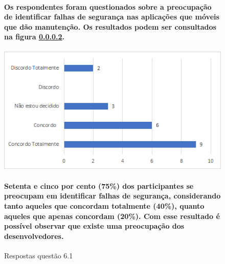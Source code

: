 \begin{figure}[!t]
\centering
\paragraph{Os respondentes foram questionados sobre a preocupação de identificar falhas de segurança nas aplicações que móveis que dão manutenção. Os resultados podem ser consultados na figura \ref{fig:6.1}.}
\includegraphics[scale=0.7]{figuras das questoes/6.1.png}
\caption{Respostas questão 6.1}
\paragraph{Setenta e cinco por cento (75{\%}) dos participantes se preocupam em identificar falhas de segurança, considerando tanto aqueles que concordam totalmente (40{\%}), quanto aqueles que apenas concordam (20{\%}). Com esse resultado é possível observar que existe uma preocupação dos desenvolvedores.
}
\label{fig:6.1}
\end{figure}
